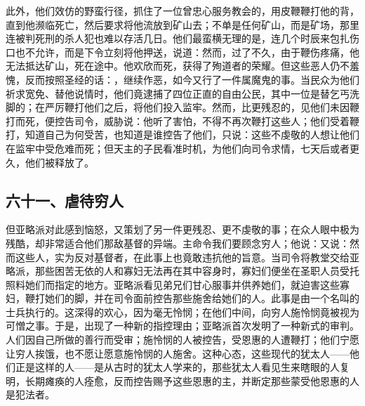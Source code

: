 此外，他们效仿的野蛮行径，抓住了一位曾忠心服务教会的，用皮鞭鞭打他的背，直到他濒临死亡，然后要求将他流放到矿山去；不单是任何矿山，而是矿场，那里连被判死刑的杀人犯也难以存活几日。他们最蛮横无理的是，连几个时辰来包扎伤口也不允许，而是下令立刻将他押送，说道：然而，过了不久，由于鞭伤疼痛，他无法抵达矿山，死在途中。他欢欣而死，获得了殉道者的荣耀。但这些恶人仍不羞愧，反而按照圣经的话：，继续作恶，如今又行了一件属魔鬼的事。当民众为他们祈求宽免、替他说情时，他们竟逮捕了四位正直的自由公民，其中一位是替乞丐洗脚的；在严厉鞭打他们之后，将他们投入监牢。然而，比更残忍的，见他们未因鞭打而死，便控告司令，威胁说：他听了害怕，不得不再次鞭打这些人；他们受着鞭打，知道自己为何受苦，也知道是谁控告了他们，只说：这些不虔敬的人想让他们在监牢中受危难而死；但天主的子民看准时机，为他们向司令求情，七天后或者更久，他们被释放了。\par


\subsection{六十一、虐待穷人}

但亚略派对此感到恼怒，又策划了另一件更残忍、更不虔敬的事；在众人眼中极为残酷，却非常适合他们那敌基督的异端。主命令我们要顾念穷人；他说：又说：然而这些人，实为反对基督者，在此事上也竟敢违抗他的旨意。当司令将教堂交给亚略派，那些困苦无依的人和寡妇无法再在其中容身时，寡妇们便坐在圣职人员受托照料她们而指定的地方。亚略派看见弟兄们甘心服事并供养她们，就迫害这些寡妇，鞭打她们的脚，并在司令面前控告那些施舍给她们的人。此事是由一个名叫的士兵执行的。这深得的欢心，因为毫无怜悯；在他们中间，向穷人施怜悯竟被视为可憎之事。于是，出现了一种新的指控理由；亚略派首次发明了一种新式的审判。人们因自己所做的善行而受审；施怜悯的人被控告，受恩惠的人遭鞭打；他们宁愿让穷人挨饿，也不愿让愿意施怜悯的人施舍。这种心态，这些现代的犹太人——他们正是这样的人——是从古时的犹太人学来的，那些犹太人看见生来瞎眼的人复明，长期瘫痪的人痊愈，反而控告赐予这些恩惠的主，并断定那些蒙受他恩惠的人是犯法者。\par

